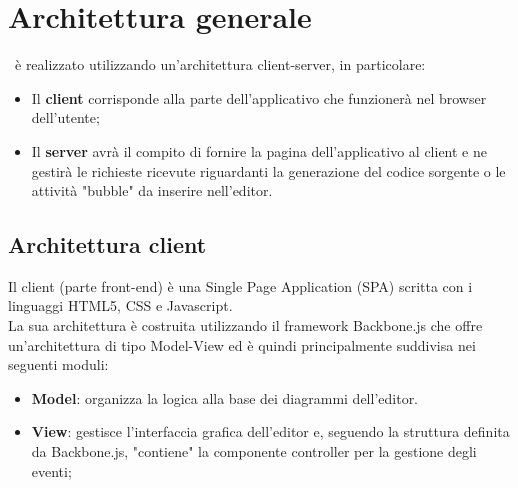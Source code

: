 \documentclass[../PianoDiQualifica.tex]{subfiles}
\begin{document}
	\section{Architettura generale}
		\progetto\ è realizzato utilizzando un'architettura client-server, in particolare:
		\begin{itemize}
			\item Il \textbf{client} corrisponde alla parte dell'applicativo che funzionerà nel
			browser dell'utente;
			\item Il \textbf{server} avrà il compito di fornire la pagina dell'applicativo al client
			e ne gestirà le richieste ricevute riguardanti la generazione del codice sorgente o le
			attività "bubble" da inserire nell'editor.
		\end{itemize}
		\subsection{Architettura client}
			Il client (parte front-end) è una Single Page Application (SPA) scritta con i linguaggi
			HTML5, CSS e Javascript.\\
			La sua architettura è costruita utilizzando il framework Backbone.js che offre
			un'architettura di tipo Model-View ed è quindi principalmente suddivisa nei seguenti moduli:
			\begin{itemize}
				\item \textbf{Model}: organizza la logica alla base dei diagrammi dell'editor.
				\item \textbf{View}: gestisce l'interfaccia grafica dell'editor e, seguendo la struttura
				definita da Backbone.js, "contiene" la componente controller per la gestione
				degli eventi; 
			\end{itemize}
\end{document}
